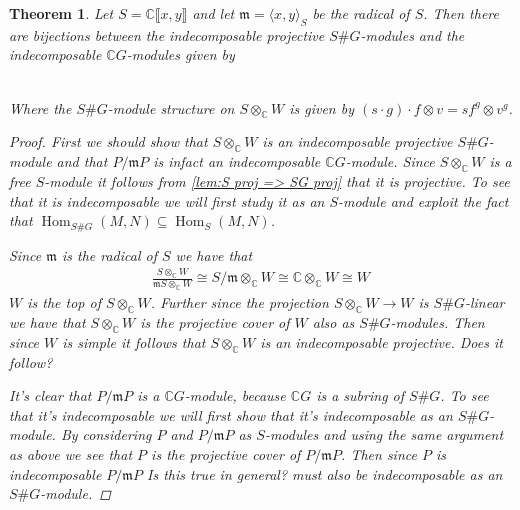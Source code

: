 \documentclass[11pt, a4paper, english]{article}
\numberwithin{prop}{section}
\numberwithin{lemma}{section}
\newtheorem{theorem}{Theorem}
\numberwithin{theorem}{section}
\numberwithin{defin}{section}
\numberwithin{example}{section}
\newcommand{\C}{\mathbb{C}}
\DeclareMathOperator{\Hom}{Hom}
\begin{document}
\begin{theorem}
Let $S = \C\llbracket x, y \rrbracket$ and let $\mathfrak{m} = \langle x, y \rangle_S$ be the radical of $S$. Then there are bijections between the indecomposable projective $S\#G$-modules and the indecomposable $\C G$-modules given by

\\
Where the $S\#G$-module structure on $S \otimes_\C W$ is given by $(s \cdot g) \cdot f \otimes v = sf^g \otimes v^g$.

\begin{proof}
First we should show that $S \otimes_\C W$ is an indecomposable projective $S\#G$-module and that $P/\mathfrak{m}P$ is infact an indecomposable $\C G$-module. Since $S \otimes_\C W$ is a free $S$-module it follows from \cref{lem:S proj => SG proj} that it is projective. To see that it is indecomposable we will first study it as an $S$-module and exploit the fact that $\Hom_{S\#G}(M,N) \subseteq \Hom_S(M,N)$. 

Since $\mathfrak{m}$ is the radical of $S$ we have that 
\begin{align*}
\frac{S \otimes_\C W}{\mathfrak{m}S \otimes_\C W} \cong S/\mathfrak{m} \otimes_\C W \cong \C \otimes_\C W \cong W
\end{align*}
$W$ is the top of $S \otimes_\C W$. Further since the projection $S \otimes_\C W \to W$ is $S\#G$-linear we have that $S \otimes_\C W$ is the projective cover of $W$ also as $S\#G$-modules. Then since $W$ is simple it follows that $S \otimes_\C W$ is an indecomposable projective. {\color{red} Does it follow?}

It's clear that $P/\mathfrak{m}P$ is a $\C G$-module, because $\C G$ is a subring of $S\#G$. To see that it's indecomposable we will first show that it's indecomposable as an $S\#G$-module. By considering $P$ and $P/\mathfrak{m}P$ as $S$-modules and using the same argument as above we see that $P$ is the projective cover of $P/\mathfrak{m}P$. Then since $P$ is indecomposable $P/\mathfrak{m}P$ {\color{red} Is this true in general?} must also be indecomposable as an $S\#G$-module.


\end{proof}
\end{theorem}
\end{document}
